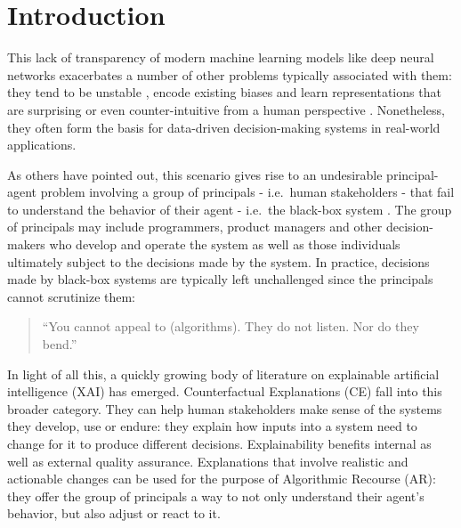 \documentclass[
  letterpaper,
  DIV=11,
  numbers=noendperiod]{scrartcl}
\author{}
\date{}
\begin{document}
\ifdefined\Shaded\renewenvironment{Shaded}{\begin{tcolorbox}[interior hidden, sharp corners, enhanced, frame hidden, borderline west={3pt}{0pt}{shadecolor}, breakable, boxrule=0pt]}{\end{tcolorbox}}\fi

\hypertarget{sec-intro}{%
\section{Introduction}\label{sec-intro}}

This lack of transparency of modern machine learning models like deep
neural networks exacerbates a number of other problems typically
associated with them: they tend to be unstable
\cite{goodfellow2014explaining}, encode existing biases
\cite{buolamwini2018gender} and learn representations that are
surprising or even counter-intuitive from a human perspective
\cite{sturm2014simple}. Nonetheless, they often form the basis for
data-driven decision-making systems in real-world applications.

As others have pointed out, this scenario gives rise to an undesirable
principal-agent problem involving a group of principals - i.e.~human
stakeholders - that fail to understand the behavior of their agent -
i.e.~the black-box system \cite{borch2022machine}. The group of
principals may include programmers, product managers and other
decision-makers who develop and operate the system as well as those
individuals ultimately subject to the decisions made by the system. In
practice, decisions made by black-box systems are typically left
unchallenged since the principals cannot scrutinize them:

\begin{quote}
``You cannot appeal to (algorithms). They do not listen. Nor do they
bend.'' \cite{oneil2016weapons}
\end{quote}

In light of all this, a quickly growing body of literature on
explainable artificial intelligence (XAI) has emerged. Counterfactual
Explanations (CE) fall into this broader category. They can help human
stakeholders make sense of the systems they develop, use or endure: they
explain how inputs into a system need to change for it to produce
different decisions. Explainability benefits internal as well as
external quality assurance. Explanations that involve realistic and
actionable changes can be used for the purpose of Algorithmic Recourse
(AR): they offer the group of principals a way to not only understand
their agent's behavior, but also adjust or react to it.
\end{document}
